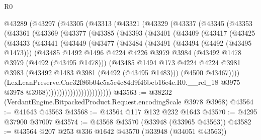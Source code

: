 \begin{lexlean}{R0}
\begin{coremodule}
    @43289
      (@43297
        (@43305
          (@43313
            (@43321
              (@43329
                (@43337
                  (@43345
                    (@43353
                      (@43361
                        (@43369
                          (@43377
                            (@43385
                              (@43393
                                (@43401
                                  (@43409
                                    (@43417
                                      (@43425
                                        (@43433
                                          (@43441
                                            (@43449
                                              (@43477
                                                (@43484
                                                  (@43491
                                                    (@43494 (@4492 (@43495 @1473)))
                                                    (@43485
                                                      @1492
                                                      @1496
                                                      @4224
                                                      @4226
                                                      @3979
                                                      @3984
                                                      (@43492 @1478 @3979 (@4492 (@43495 @1478)))
                                                      (@43485
                                                        @1494
                                                        @173
                                                        @4224
                                                        @4224
                                                        @3981
                                                        @3983
                                                        (@43492 @1483 @3981 (@4492 (@43495 @1483)))
                                                        (@4500 @43467))))
                                                  (LexLeanPreserve.Cac32f86b04c5a5e4c84d9f46beb16e4c.R0.__rel_18
                                                    @3975
                                                    @3978
                                                    @3968))))))))))))))))))))))))
@43563 := @38232 (VerdantEngine.BitpackedProduct.Request.encodingScale @3978 @3968)
@43564 := @41643 @43563
@43568 := @43564 @117 @132 @232 @1643
@43570 := @4295 @37900 @37007
@43574 := @43568 @43570 (@33948 (@33965 @43563))
@43582 := @43564 @207 @253 @336 @1642 @43570 (@33948 (@34051 @43563))

\end{coremodule}
\end{lexlean}
